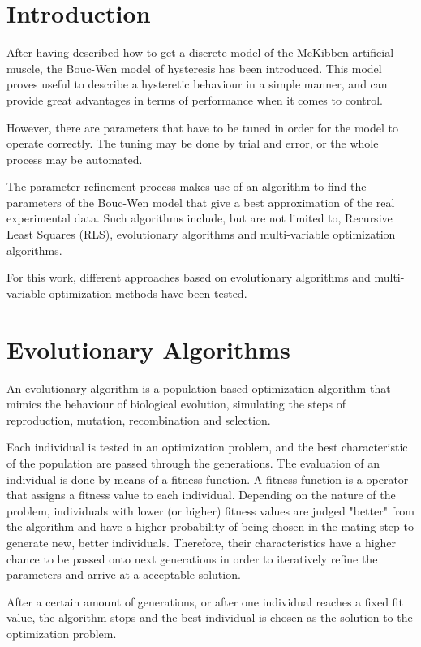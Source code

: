 \section{Introduction}
After having described how to get a discrete model of the McKibben artificial muscle,
the Bouc-Wen model of hysteresis has been introduced.
This model proves useful to describe a hysteretic behaviour in a simple manner,
and can provide great advantages in terms of performance when it comes to control.

However, there are parameters that have to be tuned in order for the model
to operate correctly. The tuning may be done by trial and error, or the whole process
may be automated.

The parameter refinement process makes use of an algorithm to
find the parameters of the Bouc-Wen model that give a best approximation
of the real experimental data. Such algorithms include, but are not limited to,
Recursive Least Squares (RLS), evolutionary algorithms
and multi-variable optimization algorithms.

For this work, different approaches based on evolutionary algorithms
and multi-variable optimization methods have been tested.


\section{Evolutionary Algorithms}
\label{sec:5.evo}

An evolutionary algorithm is a population-based optimization algorithm
that mimics the behaviour of biological evolution, simulating the steps of
reproduction, mutation, recombination and selection.

Each individual is tested in an optimization problem,
and the best characteristic of the population are passed through the generations.
The evaluation of an individual is done by means of a fitness function.
A fitness function is a operator that assigns a fitness value to each individual.
Depending on the nature of the problem, individuals with lower (or higher)
fitness values are judged "better" from the algorithm and have a higher probability
of being chosen in the mating step to generate new, better individuals.
Therefore, their characteristics have a higher chance to be passed onto next generations
in order to iteratively refine the parameters and arrive at a acceptable solution.

After a certain amount of generations, or after one individual reaches
a fixed fit value, the algorithm stops and the best individual is chosen
as the solution to the optimization problem.

